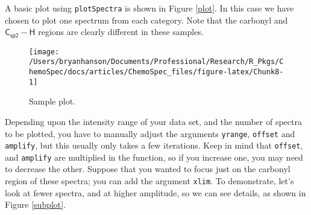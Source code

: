 \documentclass[letter,10pt,twocolumn,twoside,printwatermark=false]{pinp}
\begin{document}
A basic plot using \texttt{plotSpectra} is shown in Figure \ref{plot}.
In this case we have chosen to plot one spectrum from each category.
Note that the carbonyl and \(\mathsf{{C_{sp2}-H}}\) regions are clearly
different in these samples.

\begin{Shaded}
\begin{Highlighting}[]
\StringTok{ }\NormalTok{(}
  \OperatorTok{~}
\StringTok{  }\OperatorTok{~}
\StringTok{  }\OperatorTok{~}\OperatorTok{~}
   \NormalTok{(}\NormalTok{, }\NormalTok{, }\NormalTok{, }\NormalTok{),}
   \NormalTok{(}\NormalTok{, }\NormalTok{),}
   \NormalTok{,}
   \NormalTok{)}
\end{Highlighting}
\end{Shaded}

\begin{figure}

{\centering \texttt{[image: /Users/bryanhanson/Documents/Professional/Research/R\_Pkgs/ChemoSpec/docs/articles/ChemoSpec\_files/figure-latex/Chunk8-1]} 

}

\caption{\label{plot}Sample plot.}\label{fig:Chunk8}
\end{figure}

Depending upon the intensity range of your data set, and the number of
spectra to be plotted, you have to manually adjust the arguments
\texttt{yrange}, \texttt{offset} and \texttt{amplify}, but this usually
only takes a few iterations. Keep in mind that \texttt{offset}, and
\texttt{amplify} are multiplied in the function, so if you increase one,
you may need to decrease the other. Suppose that you wanted to focus
just on the carbonyl region of these spectra; you can add the argument
\texttt{xlim}. To demonstrate, let's look at fewer spectra, and at
higher amplitude, so we can see details, as shown in Figure
\ref{subplot}.
\end{document}
